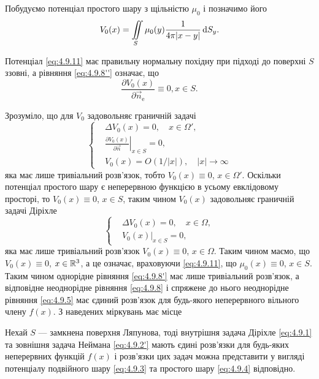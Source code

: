 Побудуємо потенціал простого шару з щільністю $\mu_0$ і позначимо його
\begin{equation}
	\label{eq:4.9.11}	
	V_0(x) = \displaystyle\iint\limits_S \mu_0(y) \frac{1}{4 \pi |x - y|} \mathop{}\!\mathrm{d} S_y.
\end{equation}

Потенціал \eqref{eq:4.9.11} має правильну нормальну похідну при підході до поверхні $S$ ззовні, а рівняння \eqref{eq:4.9.8''} означає, що
\begin{equation}
	\label{eq:4.9.12}
	\frac{\partial V_0(x)}{\partial \vec n_{\text{e}}} \equiv 0, x \in S.
\end{equation}

Зрозуміло, що для $V_0$ задовольняє граничній задачі
\begin{equation}
	\label{eq:4.9.13}
	\left\{
		\begin{aligned}
			& \Delta V_0(x) = 0, \quad x \in \Omega', \\
			& \left. \frac{\partial V_0(x)}{\partial \vec n} \right|_{x \in S} = 0,\\
			& V_0(x) = O(1/|x|), \quad |x| \to \infty
		\end{aligned}
	\right.
\end{equation}
яка має лише тривіальний розв'язок, тобто $V_0(x) \equiv 0$, $x \in \Omega'$. Оскільки потенціал простого шару є неперервною функцією в усьому евклідовому просторі, то $V_0(x) \equiv 0$, $x \in S$, таким чином $V_0(x)$ задовольняє граничній задачі Діріхле
\begin{equation}
	\left\{
		\begin{aligned}
			& \Delta V_0(x) = 0, \quad x \in \Omega, \\
			& \left .V_0(x) \right|_{x \in S} = 0,
		\end{aligned}
	\right.
\end{equation}
яка має лише тривіальний розв'язок $V_0(x) \equiv 0$, $x \in \Omega$. Таким чином маємо, що $V_0(x) \equiv 0$, $x \in \mathbb{R}^3$, а це означає, враховуючи \eqref{eq:4.9.11}, що $\mu_0(x) \equiv 0$, $x \in S$. Таким чином однорідне рівняння \eqref{eq:4.9.8'} має лише тривіальний розв'язок, а відповідне неоднорідне рівняння \eqref{eq:4.9.8} і спряжене до нього неоднорідне рівняння \eqref{eq:4.9.5} має єдиний розв'язок для будь-якого неперервного вільного члену $f(x)$. З наведених міркувань має місце 

\begin{theorem}
	Нехай $S$ --- замкнена поверхня Ляпунова, тоді внутрішня задача Діріхле \eqref{eq:4.9.1} та зовнішня задача Неймана \eqref{eq:4.9.2'} мають єдині розв'язки для будь-яких неперервних функцій $f(x)$ і розв'язки цих задач можна представити у вигляді потенціалу подвійного шару \eqref{eq:4.9.3} та простого шару \eqref{eq:4.9.4} відповідно.
\end{theorem}

